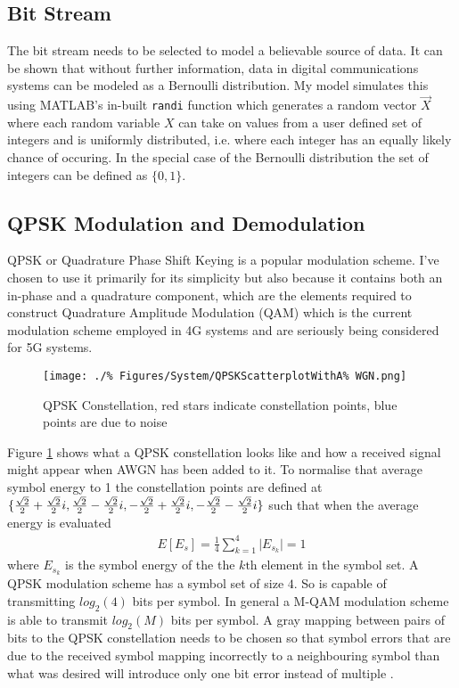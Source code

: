 \subsection{Bit Stream}
The bit stream needs to be selected to model %
a believable source of data. It can be shown %
that without further information, data %
in digital communications systems can be %
modeled as a Bernoulli distribution. %
My model simulates this using MATLAB's in-built %
\texttt{randi} \cite{randi} function which generates %
a random vector $\vec{X}$ where each %
random variable $X$ can take on values from %
a user defined set of integers and is %
uniformly distributed, i.e. where each integer %
has an equally likely chance of occuring. In %
the special case of the Bernoulli distribution %
the set of integers can be defined as $\{0,1\}$.

\subsection{QPSK Modulation and Demodulation}
\FloatBarrier
QPSK or Quadrature Phase Shift Keying is a popular %
modulation scheme. I've chosen to use it primarily %
for its simplicity but also because it contains both
an in-phase and a quadrature component, which are %
the elements required to construct %
Quadrature Amplitude Modulation (QAM) %
which is the current modulation scheme employed %
in 4G systems \cite{Rumney13}
and are seriously being considered for 5G systems.
\begin{figure}[ht]
	\centering
	\texttt{[image: ./\%
	Figures/System/QPSKScatterplotWithA\%
	WGN.png]}
	\caption{QPSK Constellation, red stars %
	indicate constellation points, blue %
	points are due to noise}
	\label{fig:QPSKConstellation}
\end{figure}

Figure \ref{fig:QPSKConstellation} shows what %
a QPSK constellation looks like and how a %
received signal might appear when AWGN has %
been added to it. To normalise that average %
symbol energy to 1 the constellation points %
are defined at $\{\frac{\sqrt{2}}{2} + \frac{%
\sqrt{2}}{2}i, \frac{\sqrt{2}}{2} - %
\frac{\sqrt{2}}{2}i, -\frac{\sqrt{2}%
}{2} + \frac{\sqrt{2}}{2}i, %
-\frac{\sqrt{2}}{2} - \frac{\sqrt{2}%
}{2}i\}$ such that when the average %
energy is evaluated
\begin{align}
	E\left[E_s\right] = \frac{1}{4} \sum_{k=1}^{4} %
	\lvert E_{s_{k}} \rvert = 1
\end{align}
where $E_{s_{k}}$ is the symbol energy of the the %
$k\text{th}$ element in the symbol set. A QPSK %
modulation scheme has a symbol set of size $4$. %
So is capable of transmitting $log_{2}(4)$ bits %
per symbol. In general a M-QAM modulation scheme %
is able to transmit $log_{2}(M)$ bits per symbol. %
A gray mapping between pairs of bits to the QPSK %
constellation needs to be chosen so that symbol %
errors that are due to the received symbol mapping %
incorrectly to a neighbouring symbol than what was %
desired will introduce only one bit error instead %
of multiple \cite{Sklar01,Goldsmith05}.

